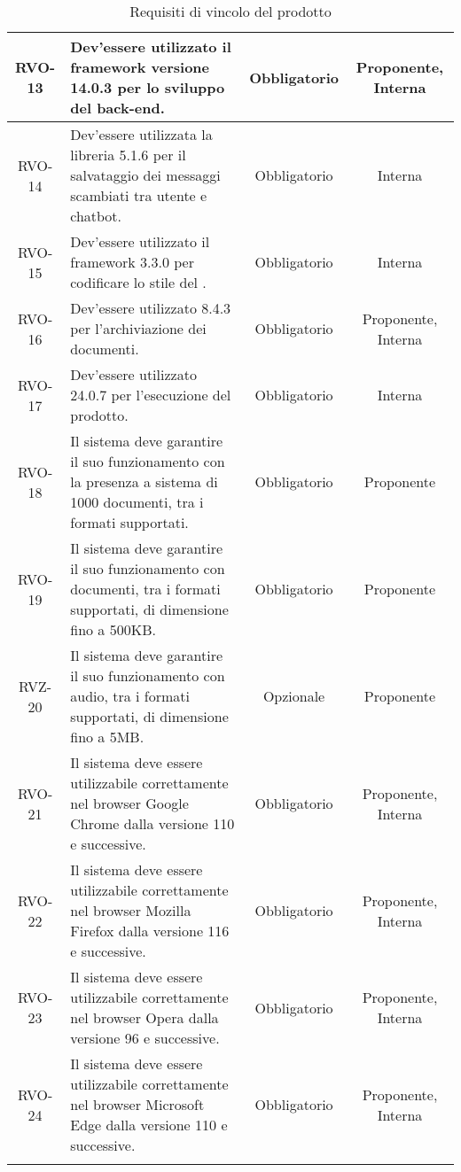 \begin{xltabular}{\textwidth}{| c | X | c | c |}
    \hline
    RVO-13 & Dev'essere utilizzato il framework  versione 14.0.3 per lo sviluppo del back-end. & Obbligatorio & Proponente, Interna \\
    \hline
    RVO-14 & Dev'essere utilizzata la libreria  5.1.6 per il salvataggio dei messaggi scambiati tra utente e chatbot. & Obbligatorio & Interna \\
    \hline
    RVO-15 & Dev'essere utilizzato il framework  3.3.0 per codificare lo stile del . & Obbligatorio & Interna \\
    \hline
    RVO-16 & Dev'essere utilizzato  8.4.3 per l'archiviazione dei documenti. & Obbligatorio & Proponente, Interna \\
    \hline
    RVO-17 & Dev'essere utilizzato  24.0.7 per l'esecuzione del prodotto. & Obbligatorio & Interna \\
    \hline
    RVO-18 & Il sistema deve garantire il suo funzionamento con la presenza a sistema di 1000 documenti, tra i formati supportati.  & Obbligatorio & Proponente\\ %
    \hline
    RVO-19 & Il sistema deve garantire il suo funzionamento con documenti, tra i formati supportati, di dimensione fino a 500KB. & Obbligatorio & Proponente\\ %
    \hline
    RVZ-20 & Il sistema deve garantire il suo funzionamento con audio, tra i formati supportati, di dimensione fino a 5MB. & Opzionale & Proponente\\
    \hline %
    RVO-21 & Il sistema deve essere utilizzabile correttamente nel browser Google Chrome dalla versione 110 e successive. & Obbligatorio & Proponente, Interna\\  %
    \hline
    RVO-22 & Il sistema deve essere utilizzabile correttamente nel browser Mozilla Firefox dalla versione 116 e successive. & Obbligatorio & Proponente, Interna\\  %
    \hline
    RVO-23 & Il sistema deve essere utilizzabile correttamente nel browser Opera dalla versione 96 e successive. & Obbligatorio & Proponente, Interna\\ %
    \hline
    RVO-24 & Il sistema deve essere utilizzabile correttamente nel browser Microsoft Edge dalla versione 110 e successive. & Obbligatorio & Proponente, Interna\\
    \hline
     \caption{Requisiti di vincolo del prodotto}
    \label{tab:reqvin}
\end{xltabular}
\endgroup

